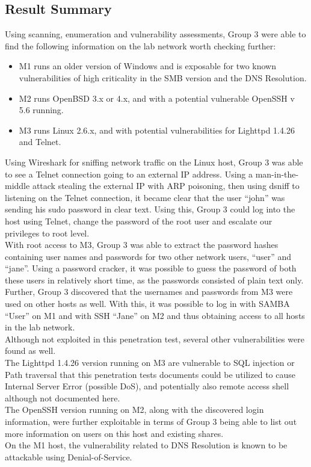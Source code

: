 \subsection{Result Summary} 
Using scanning, enumeration and vulnerability assessments, Group 3 were able to find the following information on the lab network worth checking further:
\begin{itemize}
	\item M1 runs an older version of Windows and is exposable for two known vulnerabilities of high criticality in the SMB version and the DNS Resolution.
	\item M2 runs OpenBSD 3.x or 4.x, and with a potential vulnerable OpenSSH v 5.6 running.
	\item M3 runs Linux 2.6.x, and with potential vulnerabilities for Lighttpd 1.4.26 and Telnet.
\end{itemize}
Using Wireshark for sniffing network traffic on the Linux host, Group 3 was able to see a Telnet connection going to an external IP address. Using a man-in-the-middle attack stealing the external IP with ARP poisoning, then using dsniff to listening on the Telnet connection, it became clear that the user “john” was sending his sudo password in clear text. Using this, Group 3 could log into the host using Telnet, change the password of the root user and escalate our privileges to root level.\\
With root access to M3, Group 3 was able to extract the password hashes containing user names and passwords for two other network users, “user” and “jane”. Using a password cracker, it was possible to guess the password of both these users in relatively short time, as the passwords consisted of plain text only. \\
Further, Group 3 discovered that the usernames and passwords from M3 were used on other hosts as well. With this, it was possible to log in with SAMBA “User” on M1 and with SSH “Jane” on M2 and thus obtaining access to all hosts in the lab network.\\
Although not exploited in this penetration test, several other vulnerabilities were found as well. \\
The Lighttpd 1.4.26 version running on M3 are vulnerable to SQL injection or Path traversal that this penetration tests documents could be utilized to cause Internal Server Error (possible DoS), and potentially also remote access shell although not documented here.\\
The OpenSSH version running on M2, along with the discovered login information, were further exploitable in terms of Group 3 being able to list out more information on users on this host and existing shares.\\
On the M1 host, the vulnerability related to DNS Resolution is known to be attackable using Denial-of-Service.\\
